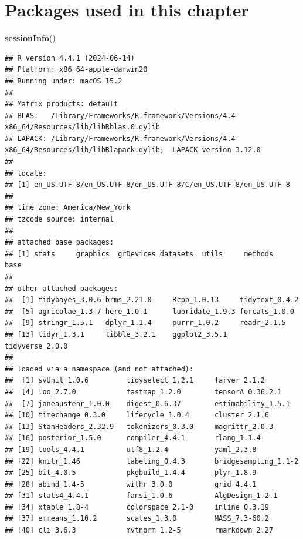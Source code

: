 \documentclass[
]{book}
\newenvironment{Shaded}{\begin{snugshade}}{\end{snugshade}}
\newcommand{\FunctionTok}[1]{\textcolor[rgb]{0.13,0.29,0.53}{\textbf{#1}}}
\newcommand{\NormalTok}[1]{#1}
\begin{document}
\section{Packages used in this chapter}\label{packages-used-in-this-chapter-1}

\begin{Shaded}
\begin{Highlighting}[]
\FunctionTok{sessionInfo}\NormalTok{()}
\end{Highlighting}
\end{Shaded}

\begin{verbatim}
## R version 4.4.1 (2024-06-14)
## Platform: x86_64-apple-darwin20
## Running under: macOS 15.2
## 
## Matrix products: default
## BLAS:   /Library/Frameworks/R.framework/Versions/4.4-x86_64/Resources/lib/libRblas.0.dylib 
## LAPACK: /Library/Frameworks/R.framework/Versions/4.4-x86_64/Resources/lib/libRlapack.dylib;  LAPACK version 3.12.0
## 
## locale:
## [1] en_US.UTF-8/en_US.UTF-8/en_US.UTF-8/C/en_US.UTF-8/en_US.UTF-8
## 
## time zone: America/New_York
## tzcode source: internal
## 
## attached base packages:
## [1] stats     graphics  grDevices datasets  utils     methods   base     
## 
## other attached packages:
##  [1] tidybayes_3.0.6 brms_2.21.0     Rcpp_1.0.13     tidytext_0.4.2 
##  [5] agricolae_1.3-7 here_1.0.1      lubridate_1.9.3 forcats_1.0.0  
##  [9] stringr_1.5.1   dplyr_1.1.4     purrr_1.0.2     readr_2.1.5    
## [13] tidyr_1.3.1     tibble_3.2.1    ggplot2_3.5.1   tidyverse_2.0.0
## 
## loaded via a namespace (and not attached):
##  [1] svUnit_1.0.6         tidyselect_1.2.1     farver_2.1.2        
##  [4] loo_2.7.0            fastmap_1.2.0        tensorA_0.36.2.1    
##  [7] janeaustenr_1.0.0    digest_0.6.37        estimability_1.5.1  
## [10] timechange_0.3.0     lifecycle_1.0.4      cluster_2.1.6       
## [13] StanHeaders_2.32.9   tokenizers_0.3.0     magrittr_2.0.3      
## [16] posterior_1.5.0      compiler_4.4.1       rlang_1.1.4         
## [19] tools_4.4.1          utf8_1.2.4           yaml_2.3.8          
## [22] knitr_1.46           labeling_0.4.3       bridgesampling_1.1-2
## [25] bit_4.0.5            pkgbuild_1.4.4       plyr_1.8.9          
## [28] abind_1.4-5          withr_3.0.0          grid_4.4.1          
## [31] stats4_4.4.1         fansi_1.0.6          AlgDesign_1.2.1     
## [34] xtable_1.8-4         colorspace_2.1-0     inline_0.3.19       
## [37] emmeans_1.10.2       scales_1.3.0         MASS_7.3-60.2       
## [40] cli_3.6.3            mvtnorm_1.2-5        rmarkdown_2.27      

\end{verbatim}
\end{document}

